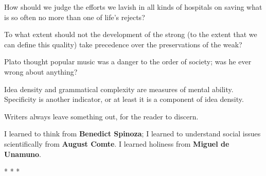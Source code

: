 \begin{quotex}
How should we judge the efforts we lavish in all kinds of hospitals on saving what is so often no more than one of life's rejects?

To what extent should not the development of the strong (to the extent that we can define this quality) take precedence over the preservations of the weak?
\end{quotex}


Plato thought popular music was a danger to the order of society; was he ever wrong about anything?

Idea density and grammatical complexity are measures of mental ability. Specificity is another indicator, or at least it is a component of idea density.

Writers always leave something out, for the reader to discern.

I learned to think from \textbf{Benedict Spinoza}; I learned to understand social issues scientifically from \textbf{August Comte}. I learned holiness from \textbf{Miguel de Unamuno}.



\begin{center}* * *\end{center}

